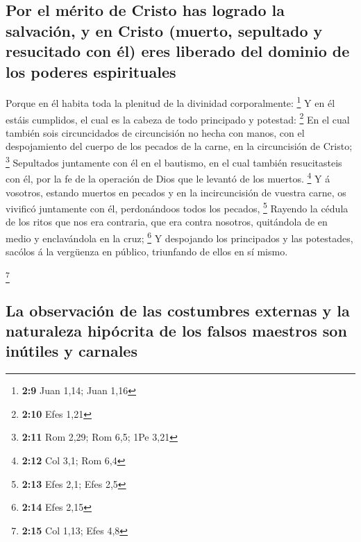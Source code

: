 \hypertarget{por-el-muxe9rito-de-cristo-has-logrado-la-salvaciuxf3n-y-en-cristo-muerto-sepultado-y-resucitado-con-uxe9l-eres-liberado-del-dominio-de-los-poderes-espirituales}{%
\subsection{Por el mérito de Cristo has logrado la salvación, y en
Cristo (muerto, sepultado y resucitado con él) eres liberado del dominio
de los poderes
espirituales}\label{por-el-muxe9rito-de-cristo-has-logrado-la-salvaciuxf3n-y-en-cristo-muerto-sepultado-y-resucitado-con-uxe9l-eres-liberado-del-dominio-de-los-poderes-espirituales}}

 Porque en él habita toda la plenitud de la divinidad
corporalmente: \footnote{\textbf{2:9} Juan 1,14; Juan 1,16}
 Y en él estáis cumplidos, el cual es la cabeza de todo
principado y potestad: \footnote{\textbf{2:10} Efes 1,21} 
En el cual también sois circuncidados de circuncisión no hecha con
manos, con el despojamiento del cuerpo de los pecados de la carne, en la
circuncisión de Cristo; \footnote{\textbf{2:11} Rom 2,29; Rom 6,5; 1Pe
  3,21}  Sepultados juntamente con él en el bautismo, en el
cual también resucitasteis con él, por la fe de la operación de Dios que
le levantó de los muertos. \footnote{\textbf{2:12} Col 3,1; Rom 6,4}
 Y á vosotros, estando muertos en pecados y en la
incircuncisión de vuestra carne, os vivificó juntamente con él,
perdonándoos todos los pecados, \footnote{\textbf{2:13} Efes 2,1; Efes
  2,5}  Rayendo la cédula de los ritos que nos era
contraria, que era contra nosotros, quitándola de en medio y
enclavándola en la cruz; \footnote{\textbf{2:14} Efes 2,15}
 Y despojando los principados y las potestades, sacólos á
la vergüenza en público, triunfando de ellos en sí mismo.

\footnote{\textbf{2:15} Col 1,13; Efes 4,8}

\hypertarget{la-observaciuxf3n-de-las-costumbres-externas-y-la-naturaleza-hipuxf3crita-de-los-falsos-maestros-son-inuxfatiles-y-carnales}{%
\subsection{La observación de las costumbres externas y la naturaleza
hipócrita de los falsos maestros son inútiles y
carnales}\label{la-observaciuxf3n-de-las-costumbres-externas-y-la-naturaleza-hipuxf3crita-de-los-falsos-maestros-son-inuxfatiles-y-carnales}}

